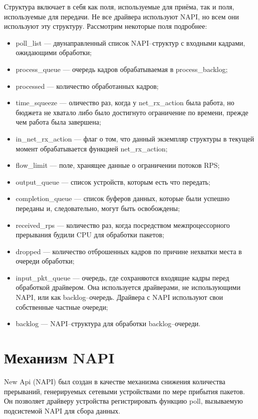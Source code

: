 Структура включает в себя как поля, используемые для приёма, так и поля, используемые для передачи. Не все драйвера используют NAPI, но всем они используют эту структуру. Рассмотрим некоторые поля подробнее:
\begin{itemize}[label=---]
	\item poll\_list --- двунаправленный список NAPI--структур с входными кадрами, ожидающими обработки;
	\item process\_queue --- очередь кадров обрабатываемая в process\_backlog;
	\item processed --- количество обработанных кадров;
	\item time\_squeeze --- оличество раз, когда у net\_rx\_action была работа, но бюджета не хватало либо было достигнуто ограничение по времени, прежде чем работа была завершена;
	\item in\_net\_rx\_action --- флаг о том, что данный экземпляр структуры в текущей момент обрабатывается функцией  net\_rx\_action;
	\item flow\_limit --- поле, хранящее данные о ограничении потоков RPS;
	\item output\_queue --- список устройств, которым есть что передать;
	\item completion\_queue --- список буферов данных, которые были успешно переданы и, следовательно, могут быть освобождены;
	\item received\_rps --- количество раз, когда посредством межпроцессорного прерывания будили CPU для обработки пакетов;
	\item dropped --- количество отброшенных кадров по причине нехватки места в очереди обработки;
	\item input\_pkt\_queue --- очередь, где сохраняются входящие кадры перед обработкой драйвером. Она используется драйверами, не использующими NAPI, или как backlog--очередь. Драйвера с NAPI используют свои собственные частные очереди;
	\item backlog --- NAPI--структура для обработки backlog--очереди.
\end{itemize}

\section{Механизм NAPI}

New Api (NAPI) был создан в качестве механизма снижения количества прерываний, генерируемых сетевыми устройствами по мере прибытия пакетов. Он позволяет драйверу устройства регистрировать функцию poll, вызываемую подсистемой NAPI для сбора данных.

